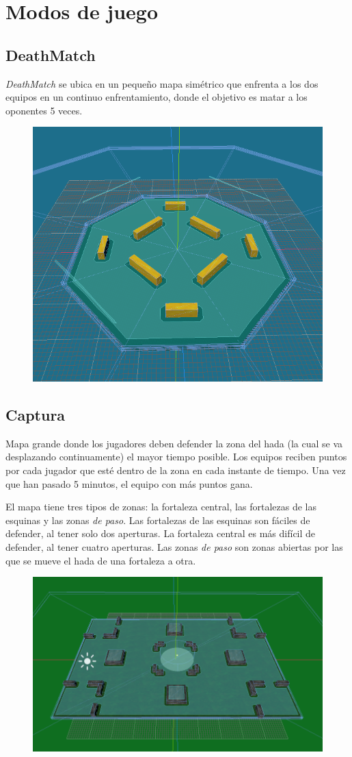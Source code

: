 \section{Modos de juego}

\subsection{DeathMatch}
\emph{DeathMatch} se ubica en un pequeño mapa simétrico que enfrenta a los dos equipos en un continuo enfrentamiento, donde el objetivo es matar a los oponentes 5 veces.

\begin{figure}[H]
	\centering
	\includegraphics[width=0.5\linewidth]{figures/DeathMatchStage.png}
	\label{fig:DeathMatchStage}
\end{figure}

\vspace{\baselineskip}

\subsection{Captura}
Mapa grande donde los jugadores deben defender la zona del hada (la cual se va desplazando continuamente) el mayor tiempo posible. Los equipos reciben puntos por cada jugador que esté dentro de la zona en cada instante de tiempo. Una vez que han pasado 5 minutos, el equipo con más puntos gana.

\vspace{\baselineskip}

El mapa tiene tres tipos de zonas: la fortaleza central, las fortalezas de las esquinas y las zonas \emph{de paso}. Las fortalezas de las esquinas son fáciles de defender, al tener solo dos aperturas. La fortaleza central es más difícil de defender, al tener cuatro aperturas. Las zonas \emph{de paso} son zonas abiertas por las que se mueve el hada de una fortaleza a otra.

\begin{figure}[H]
	\centering
	\includegraphics[width=0.7\linewidth]{figures/CaptureStage.png}
	\label{fig:CaptureStage}
\end{figure}